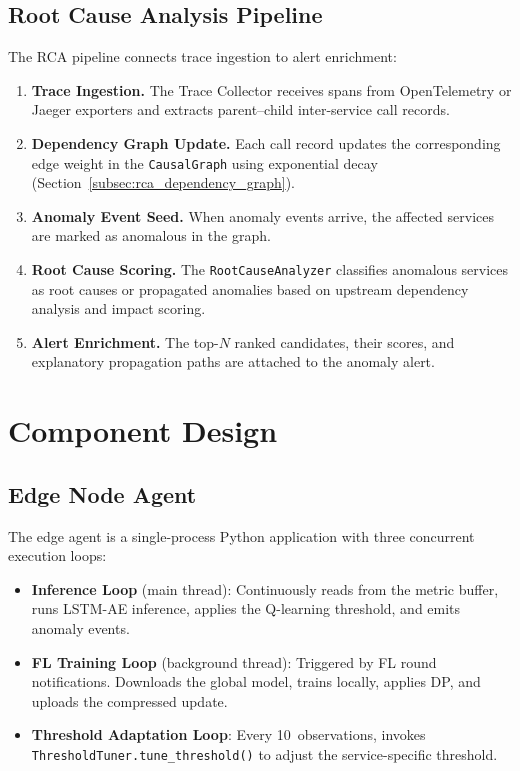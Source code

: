\subsection{Root Cause Analysis Pipeline}
\label{subsec:design_rca_pipeline}

The RCA pipeline connects trace ingestion to alert enrichment:

\begin{enumerate}
    \item \textbf{Trace Ingestion.} The Trace Collector receives spans from
    OpenTelemetry or Jaeger exporters and extracts parent--child
    inter-service call records.

    \item \textbf{Dependency Graph Update.} Each call record updates the
    corresponding edge weight in the {\texttt{CausalGraph}} using exponential
    decay (Section~\ref{subsec:rca_dependency_graph}).

    \item \textbf{Anomaly Event Seed.} When anomaly events arrive, the
    affected services are marked as anomalous in the graph.

    \item \textbf{Root Cause Scoring.} The \texttt{RootCauseAnalyzer}
    classifies anomalous services as root causes or propagated anomalies
    based on upstream dependency analysis and impact scoring.

    \item \textbf{Alert Enrichment.} The top-$N$ ranked candidates, their
    scores, and explanatory propagation paths are attached to the anomaly
    alert.
\end{enumerate}

\section{Component Design}
\label{sec:design_components}

\subsection{Edge Node Agent}
\label{subsec:design_edge_agent}

The edge agent is a single-process Python application with three concurrent
execution loops:

\begin{itemize}
    \item \textbf{Inference Loop} (main thread): Continuously reads from the
    metric buffer, runs LSTM-AE inference, applies the Q-learning threshold,
    and emits anomaly events.

    \item \textbf{FL Training Loop} (background thread): Triggered by FL round
    notifications. Downloads the global model, trains locally, applies DP, and
    uploads the compressed update.

    \item \textbf{Threshold Adaptation Loop}: Every 10~observations, invokes
    \texttt{ThresholdTuner.tune\_threshold()} to adjust the service-specific
    threshold.
\end{itemize}

